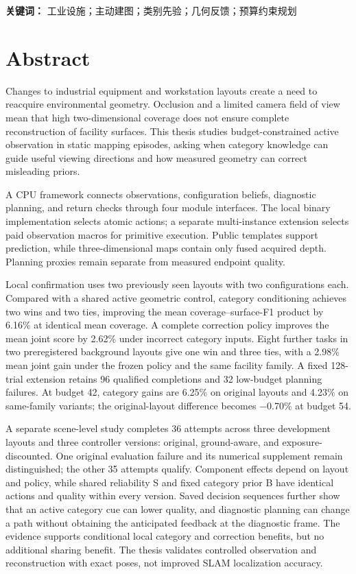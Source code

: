 \documentclass[11pt,a4paper]{article}
\numberwithin{equation}{section}
\begin{document}
\noindent\textbf{关键词：} 工业设施；主动建图；类别先验；几何反馈；预算约束规划
\clearpage
\section*{Abstract}
Changes to industrial equipment and workstation layouts create a need to reacquire environmental geometry. Occlusion and a limited camera field of view mean that high two-dimensional coverage does not ensure complete reconstruction of facility surfaces. This thesis studies budget-constrained active observation in static mapping episodes, asking when category knowledge can guide useful viewing directions and how measured geometry can correct misleading priors.

A CPU framework connects observations, configuration beliefs, diagnostic planning, and return checks through four module interfaces. The local binary implementation selects atomic actions; a separate multi-instance extension selects paid observation macros for primitive execution. Public templates support prediction, while three-dimensional maps contain only fused acquired depth. Planning proxies remain separate from measured endpoint quality.

Local confirmation uses two previously seen layouts with two configurations each. Compared with a shared active geometric control, category conditioning achieves two wins and two ties, improving the mean coverage--surface-F1 product by 6.16\% at identical mean coverage. A complete correction policy improves the mean joint score by 2.62\% under incorrect category inputs. Eight further tasks in two preregistered background layouts give one win and three ties, with a 2.98\% mean joint gain under the frozen policy and the same facility family. A fixed 128-trial extension retains 96 qualified completions and 32 low-budget planning failures. At budget 42, category gains are 6.25\% on original layouts and 4.23\% on same-family variants; the original-layout difference becomes −0.70\% at budget 54.

A separate scene-level study completes 36 attempts across three development layouts and three controller versions: original, ground-aware, and exposure-discounted. One original evaluation failure and its numerical supplement remain distinguished; the other 35 attempts qualify. Component effects depend on layout and policy, while shared reliability S and fixed category prior B have identical actions and quality within every version. Saved decision sequences further show that an active category cue can lower quality, and diagnostic planning can change a path without obtaining the anticipated feedback at the diagnostic frame. The evidence supports conditional local category and correction benefits, but no additional sharing benefit. The thesis validates controlled observation and reconstruction with exact poses, not improved SLAM localization accuracy.
\end{document}
